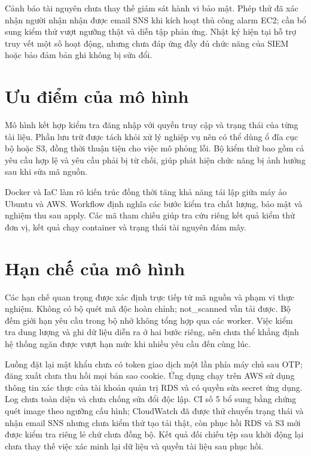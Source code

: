 Cảnh báo tài nguyên chưa thay thế giám sát hành vi bảo mật. Phép thử đã xác nhận người nhận nhận được email SNS khi kích hoạt thủ công alarm EC2; cần bổ sung kiểm thử vượt ngưỡng thật và diễn tập phản ứng. Nhật ký hiện tại hỗ trợ truy vết một số hoạt động, nhưng chưa đáp ứng đầy đủ chức năng của SIEM hoặc bảo đảm bản ghi không bị sửa đổi.

\section{Ưu điểm của mô hình}
Mô hình kết hợp kiểm tra đăng nhập với quyền truy cập và trạng thái của từng tài liệu. Phần lưu trữ được tách khỏi xử lý nghiệp vụ nên có thể dùng ổ đĩa cục bộ hoặc S3, đồng thời thuận tiện cho việc mô phỏng lỗi. Bộ kiểm thử bao gồm cả yêu cầu hợp lệ và yêu cầu phải bị từ chối, giúp phát hiện chức năng bị ảnh hưởng sau khi sửa mã nguồn.

Docker và IaC làm rõ kiến trúc đồng thời tăng khả năng tái lập giữa máy ảo Ubuntu và AWS. Workflow định nghĩa các bước kiểm tra chất lượng, bảo mật và nghiệm thu sau apply. Các mã tham chiếu giúp tra cứu riêng kết quả kiểm thử đơn vị, kết quả chạy container và trạng thái tài nguyên đám mây.

\section{Hạn chế của mô hình}
Các hạn chế quan trọng được xác định trực tiếp từ mã nguồn và phạm vi thực nghiệm. Không có bộ quét mã độc hoàn chỉnh; not\_scanned vẫn tải được. Bộ đếm giới hạn yêu cầu trong bộ nhớ không tổng hợp qua các worker. Việc kiểm tra dung lượng và ghi dữ liệu diễn ra ở hai bước riêng, nên chưa thể khẳng định hệ thống ngăn được vượt hạn mức khi nhiều yêu cầu đến cùng lúc.

Luồng đặt lại mật khẩu chưa có token giao dịch một lần phía máy chủ sau OTP; đăng xuất chưa thu hồi mọi bản sao cookie. Ứng dụng chạy trên AWS sử dụng thông tin xác thực của tài khoản quản trị RDS và có quyền sửa secret ứng dụng. Log chưa toàn diện và chưa chống sửa đổi độc lập. CI số 5 bổ sung bằng chứng quét image theo ngưỡng cấu hình; CloudWatch đã được thử chuyển trạng thái và nhận email SNS nhưng chưa kiểm thử tạo tải thật, còn phục hồi RDS và S3 mới được kiểm tra riêng lẻ chứ chưa đồng bộ. Kết quả đối chiếu tệp sau khởi động lại chưa thay thế việc xác minh lại dữ liệu và quyền tài liệu sau phục hồi.


